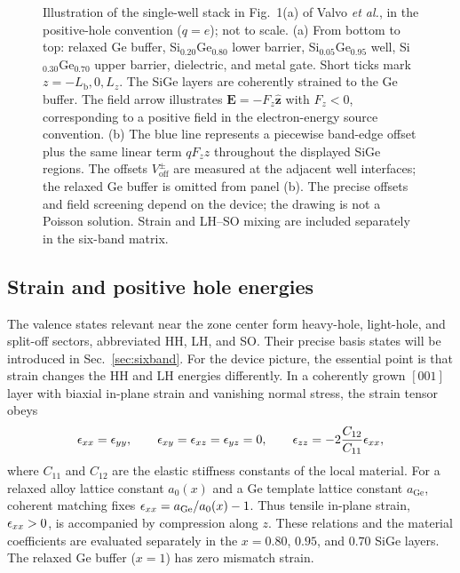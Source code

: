 \begin{figure}[!htbp]
{%
}
\endgroup
\caption{Illustration of the single-well stack in Fig.~1(a) of
Valvo \emph{et al.}, in the positive-hole convention ($q=e$); not to scale.
(a) From bottom to top: relaxed Ge buffer, Si$_{0.20}$Ge$_{0.80}$ lower
barrier, Si$_{0.05}$Ge$_{0.95}$ well, Si$_{0.30}$Ge$_{0.70}$ upper barrier,
dielectric, and metal gate. Short ticks mark $z=-L_{\mathrm b},0,L_z$.
The SiGe layers are coherently strained to the Ge buffer. The field arrow
illustrates $\mathbf E=-F_z\hat{\mathbf z}$ with $F_z<0$, corresponding to
a positive field in the electron-energy source convention.
(b) The blue line represents a piecewise band-edge offset plus the same
linear term $qF_z z$ throughout the displayed SiGe regions. The offsets
$V_{\mathrm{off}}^{\pm}$ are measured at the adjacent well interfaces; the
relaxed Ge buffer is omitted from panel (b). The precise offsets and field
screening depend on the device; the drawing is not a Poisson solution.
Strain and LH--SO mixing are included separately in the six-band matrix.}
\label{fig:device-schematic}
\end{figure}


\subsection{Strain and positive hole energies}

The valence states relevant near the zone center form heavy-hole, light-hole, and split-off sectors, abbreviated HH, LH, and SO. Their precise basis states will be introduced in Sec.~\ref{sec:sixband}. For the device picture, the essential point is that strain changes the HH and LH energies differently. In a coherently grown $[001]$ layer with biaxial in-plane strain and vanishing normal stress, the strain tensor obeys
\begin{equation}
\epsilon_ {xx}=\epsilon_ {yy},\qquad
\epsilon_ {xy}=\epsilon_ {xz}=\epsilon_ {yz}=0,\qquad
\epsilon_ {zz}=-2\frac{C_{12}}{C_{11}}\epsilon_ {xx},
\label{eq:biaxial}
\end{equation}
where $C_{11}$ and $C_{12}$ are the elastic stiffness constants of the local material. For a relaxed alloy lattice constant $a_0(x)$ and a Ge template lattice constant $a_{\mathrm{Ge}}$, coherent matching fixes $\epsilon_ {xx}=a_{\mathrm{Ge}}/a_0(x)-1$. Thus tensile in-plane strain, $\epsilon_ {xx}>0$, is accompanied by compression along $z$. These relations and the material coefficients are evaluated separately in the $x=0.80$, $0.95$, and $0.70$ SiGe layers. The relaxed Ge buffer ($x=1$) has zero mismatch strain.

